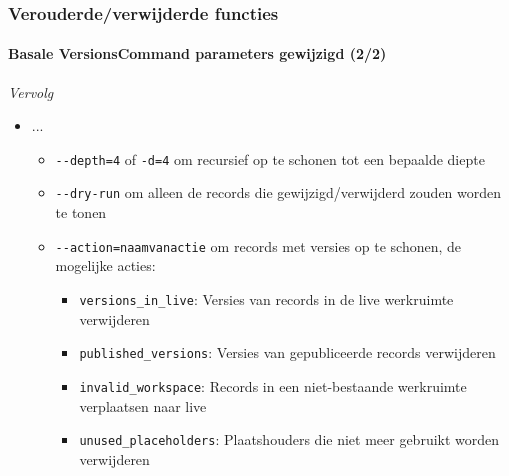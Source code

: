 \begin{frame}[fragile]
	\frametitle{Verouderde/verwijderde functies}
	\framesubtitle{Basale VersionsCommand parameters gewijzigd (2/2)}

	\small\textit{Vervolg}\normalsize

	\begin{itemize}
		\item ...
			\begin{itemize}
				\item \texttt{-}\texttt{-depth=4} of \texttt{-d=4} om recursief op te schonen tot een bepaalde diepte
				\item \texttt{-}\texttt{-dry-run} om alleen de records die gewijzigd/verwijderd zouden worden te tonen
				\item \texttt{-}\texttt{-action=naamvanactie} om records met versies op te schonen,
					de mogelijke acties:
					\begin{itemize}
						\item \texttt{versions\_in\_live}: Versies van records in de live werkruimte verwijderen
						\item \texttt{published\_versions}: Versies van gepubliceerde records verwijderen
						\item \texttt{invalid\_workspace}: Records in een niet-bestaande werkruimte verplaatsen naar live
						\item \texttt{unused\_placeholders}: Plaatshouders die niet meer gebruikt worden verwijderen
					\end{itemize}
			\end{itemize}
	\end{itemize}

\end{frame}


